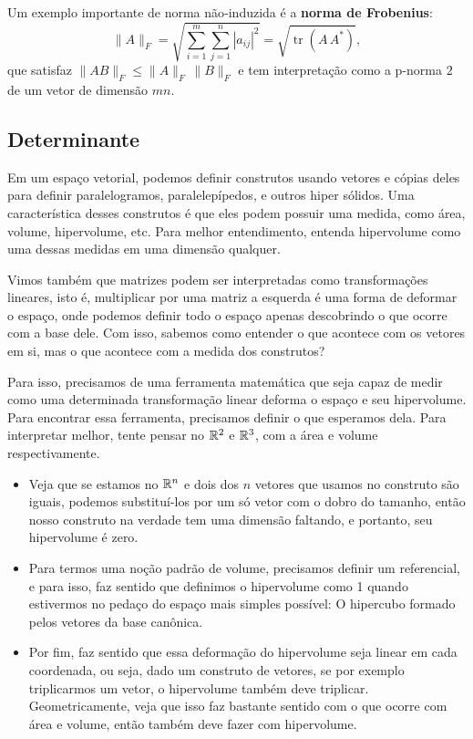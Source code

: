\documentclass[11pt, a4paper]{article}
\begin{document}
\medskip

Um exemplo importante de norma não‑induzida é a \textbf{norma de Frobenius}:
\[
\|A\|_F = \sqrt{\sum_{i=1}^m\sum_{j=1}^n |a_{ij}|^2}
       = \sqrt{\operatorname{tr}(A\,A^*)},
\]
que satisfaz \(\|AB\|_F\le\|A\|_F\,\|B\|_F\) e tem interpretação como a p-norma \(2\) de um vetor de dimensão \(mn\).

\void[-0.5]

\subsection{Determinante}

Em um espaço vetorial, podemos definir construtos usando vetores e cópias deles para definir paralelogramos, paralelepípedos, e outros hiper sólidos. Uma característica desses construtos é que eles podem possuir uma medida, como área, volume, hipervolume, etc. Para melhor entendimento, entenda hipervolume como uma dessas medidas em uma dimensão qualquer.

Vimos também que matrizes podem ser interpretadas como transformações lineares, isto é, multiplicar por uma matriz a esquerda é uma forma de deformar o espaço, onde podemos definir todo o espaço apenas descobrindo o que ocorre com a base dele. Com isso, sabemos como entender o que acontece com os vetores em si, mas o que acontece com a medida dos construtos? 

Para isso, precisamos de uma ferramenta matemática que seja capaz de medir como uma determinada transformação linear deforma o espaço e seu hipervolume. Para encontrar essa ferramenta, precisamos definir o que esperamos dela. Para interpretar melhor, tente pensar no \(\mathbb{R}^2\) e \(\mathbb{R}^3\), com a área e volume respectivamente.

\begin{itemize}
    \item Veja que se estamos no \(\mathbb{R}^n\) e dois dos \(n\) vetores que usamos no construto são iguais, podemos substituí-los por um só vetor com o dobro do tamanho, então nosso construto na verdade tem uma dimensão faltando, e portanto, seu hipervolume é zero.
    \item Para termos uma noção padrão de volume, precisamos definir um referencial, e para isso, faz sentido que definimos o hipervolume como 1 quando estivermos no pedaço do espaço mais simples possível: O hipercubo formado pelos vetores da base canônica.
    \item Por fim, faz sentido que essa deformação do hipervolume seja linear em cada coordenada, ou seja, dado um construto de vetores, se por exemplo triplicarmos um vetor, o hipervolume também deve triplicar. Geometricamente, veja que isso faz bastante sentido com o que ocorre com área e volume, então também deve fazer com hipervolume.
\end{itemize}
\end{document}
